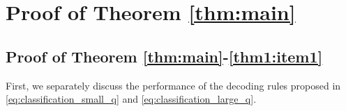 \documentclass[onecolumn,letterpaper]{IEEEtran}
\DeclareMathOperator*{\argmin}{argmin}
\newcommand{\cp}{{q}}
\newcommand{\pgap}{{\Delta(\cp)}}
\newcommand{\cpn}{{\cp^*}}
\newcommand{\up}{{U}}
\newcommand{\lw}{{L}}
\newcommand{\exi}{{i}}
\newcommand{\sig}{{\lambda}}
\newcommand{\sigi}{{\sig_{\exi}}}
\newcommand{\sigio}{{\sig_{\exi+1}}}
\newcommand{\ta}{{\tau}}
\newcommand{\ftaup}{{\hat{\Gamma}}}
\newcommand{\fTp}{\ftaup (\cp)}
\newcommand{\fTpn}{\ftaup (\cpn)}
\newcommand{\cpns}{\cp_0}
\newcommand{\fTpns}{\ftaup (\cpns)}
\newcommand{\pgapns}{{\Delta(\cpns)}}
\begin{document}








\section{Proof of Theorem \ref{thm:main}}
\label{sec:proof:thm_main}
\subsection{Proof of Theorem \ref{thm:main}-\ref{thm1:item1}} \label{sec:proof_thm_1_1}
First, we separately discuss the performance of the decoding rules proposed in \eqref{eq:classification_small_q} and \eqref{eq:classification_large_q}. 
\end{document}
